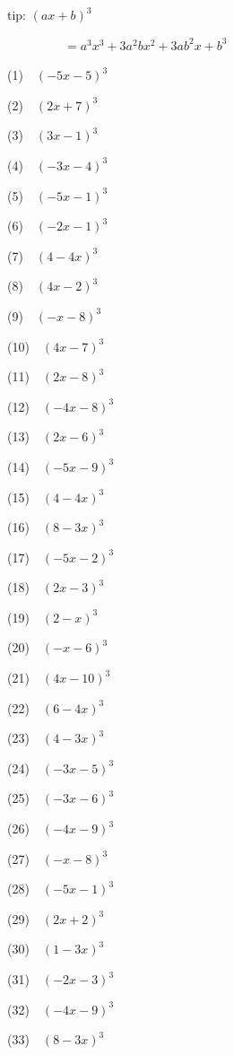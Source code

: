 \documentclass[a4j,twocolumn,10pt,fleqn]{jarticle}
\begin{document}
tip: $\left(a x + b\right)^{3}$

~~~~~~~~~$=a^{3} x^{3} + 3 a^{2} b x^{2} + 3 a b^{2} x + b^{3}$


(1)~~$\left(- 5 x - 5\right)^{3}$

(2)~~$\left(2 x + 7\right)^{3}$

(3)~~$\left(3 x - 1\right)^{3}$

(4)~~$\left(- 3 x - 4\right)^{3}$

(5)~~$\left(- 5 x - 1\right)^{3}$

(6)~~$\left(- 2 x - 1\right)^{3}$

(7)~~$\left(4 - 4 x\right)^{3}$

(8)~~$\left(4 x - 2\right)^{3}$

(9)~~$\left(- x - 8\right)^{3}$

(10)~~$\left(4 x - 7\right)^{3}$

(11)~~$\left(2 x - 8\right)^{3}$

(12)~~$\left(- 4 x - 8\right)^{3}$

(13)~~$\left(2 x - 6\right)^{3}$

(14)~~$\left(- 5 x - 9\right)^{3}$

(15)~~$\left(4 - 4 x\right)^{3}$

(16)~~$\left(8 - 3 x\right)^{3}$

(17)~~$\left(- 5 x - 2\right)^{3}$

(18)~~$\left(2 x - 3\right)^{3}$

(19)~~$\left(2 - x\right)^{3}$

(20)~~$\left(- x - 6\right)^{3}$

(21)~~$\left(4 x - 10\right)^{3}$

(22)~~$\left(6 - 4 x\right)^{3}$

(23)~~$\left(4 - 3 x\right)^{3}$

(24)~~$\left(- 3 x - 5\right)^{3}$

(25)~~$\left(- 3 x - 6\right)^{3}$

(26)~~$\left(- 4 x - 9\right)^{3}$

(27)~~$\left(- x - 8\right)^{3}$

(28)~~$\left(- 5 x - 1\right)^{3}$

(29)~~$\left(2 x + 2\right)^{3}$

(30)~~$\left(1 - 3 x\right)^{3}$

(31)~~$\left(- 2 x - 3\right)^{3}$

(32)~~$\left(- 4 x - 9\right)^{3}$

(33)~~$\left(8 - 3 x\right)^{3}$
\end{document}
